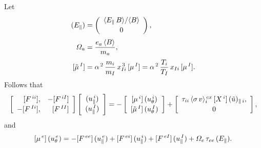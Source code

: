 \documentclass[12pt]{article}
\begin{document}
Let
\begin{align}
(E_\parallel) &=\left(\begin{array}{c}\langle E_\parallel\,B\rangle/\langle B\rangle\\[0.5ex]
0\end{array}\right),\\[0.5ex]
{\mit\Omega}_a &= \frac{e_a\,\langle B\rangle}{m_a},\\[0.5ex]
[\tilde{\mu}^{\,I}] &= \alpha^{\,2}\,\frac{m_i}{m_I}\,x_{Ii}^{\,3}\,[\mu^{\,I}]=\alpha^{\,2}\,\frac{T_i}{T_I}\,x_{Ii}\,[\mu^{\,I}].
\end{align}
Follows that
\begin{equation}
\left[\begin{array}{rr} [F^{\,ii}], & -[F^{\,iI}]\\[0.5ex] -[F^{\,Ii}], & [F^{\,II}]\end{array}\right]
\left[\begin{array}{c}(u_\parallel^{\,i}) \\[0.5ex] (u_\parallel^{\,I})\end{array}\right]
= -\left[\begin{array}{c} [\mu^{\,i}]\,(u_\theta^{\,i}) \\[0.5ex]
[\tilde{\mu}^{\,I}]\,(u_\theta^{\,I})\end{array}\right]+\left[\begin{array}{c}{\tau_{ii}\,\langle\sigma\,v\rangle_i^{\,cx}\,[X^{\,i}]\,(\tilde{u})_{\parallel\,i}},\\[0.5ex] 0\end{array}\right]\\[0.5ex],
\end{equation}
and
\begin{equation}\label{e173}
[\mu^{\,e}]\,(u_\theta^{\,e})= -[F^{\,ee}]\,(u_\parallel^{\,e})+[F^{\,ei}]\,(u_\parallel^{\,i})+[F^{\,eI}]\,(u_\parallel^{\,I})+{\mit\Omega}_e\,\tau_{ee}\,(E_\parallel).
\end{equation}
\end{document}
